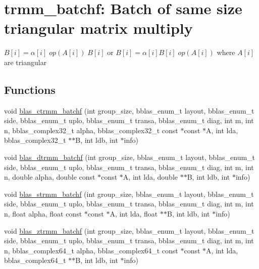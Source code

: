 \hypertarget{group__trmm__batchf}{}\section{trmm\+\_\+batchf\+: Batch of same size triangular matrix multiply}
\label{group__trmm__batchf}


$ B[i] = \alpha[i] \;op(A[i])\; B[i] $ or $ B[i] = \alpha[i] B[i] \;op(A[i]) $ where $ A[i] $ are triangular  


\subsection*{Functions}
\begin{DoxyCompactItemize}
\item 
void \mbox{\hyperlink{group__trmm__batchf_ga64f7bbfcf4afda9c0cb5ed92dfe875ea}{blas\+\_\+ctrmm\+\_\+batchf}} (int group\+\_\+size, bblas\+\_\+enum\+\_\+t layout, bblas\+\_\+enum\+\_\+t side, bblas\+\_\+enum\+\_\+t uplo, bblas\+\_\+enum\+\_\+t transa, bblas\+\_\+enum\+\_\+t diag, int m, int n, bblas\+\_\+complex32\+\_\+t alpha, bblas\+\_\+complex32\+\_\+t const $\ast$const $\ast$A, int lda, bblas\+\_\+complex32\+\_\+t $\ast$$\ast$B, int ldb, int $\ast$info)
\item 
void \mbox{\hyperlink{group__trmm__batchf_ga5ec52f4bdb997bc0f3c8045fbd7a3280}{blas\+\_\+dtrmm\+\_\+batchf}} (int group\+\_\+size, bblas\+\_\+enum\+\_\+t layout, bblas\+\_\+enum\+\_\+t side, bblas\+\_\+enum\+\_\+t uplo, bblas\+\_\+enum\+\_\+t transa, bblas\+\_\+enum\+\_\+t diag, int m, int n, double alpha, double const $\ast$const $\ast$A, int lda, double $\ast$$\ast$B, int ldb, int $\ast$info)
\item 
void \mbox{\hyperlink{group__trmm__batchf_ga5c431462721e9faae6711830d473c713}{blas\+\_\+strmm\+\_\+batchf}} (int group\+\_\+size, bblas\+\_\+enum\+\_\+t layout, bblas\+\_\+enum\+\_\+t side, bblas\+\_\+enum\+\_\+t uplo, bblas\+\_\+enum\+\_\+t transa, bblas\+\_\+enum\+\_\+t diag, int m, int n, float alpha, float const $\ast$const $\ast$A, int lda, float $\ast$$\ast$B, int ldb, int $\ast$info)
\item 
void \mbox{\hyperlink{group__trmm__batchf_ga8649c49d5fcfc65a5cf0432fdf29660b}{blas\+\_\+ztrmm\+\_\+batchf}} (int group\+\_\+size, bblas\+\_\+enum\+\_\+t layout, bblas\+\_\+enum\+\_\+t side, bblas\+\_\+enum\+\_\+t uplo, bblas\+\_\+enum\+\_\+t transa, bblas\+\_\+enum\+\_\+t diag, int m, int n, bblas\+\_\+complex64\+\_\+t alpha, bblas\+\_\+complex64\+\_\+t const $\ast$const $\ast$A, int lda, bblas\+\_\+complex64\+\_\+t $\ast$$\ast$B, int ldb, int $\ast$info)
\end{DoxyCompactItemize}


